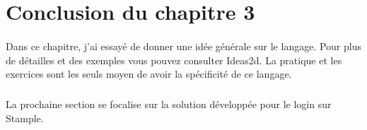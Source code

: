 \section{Conclusion du chapitre 3}
\paragraph{}
Dans ce chapitre, j'ai essayé de donner une idée générale sur le langage. Pour plus de détailles et des exemples vous pouvez consulter Ideas2d. 
La pratique et les exercices sont les seuls moyen de avoir la spécificité de ce langage.
\subparagraph{}
La prochaine section se focalise sur la solution développée pour le login sur Stample.








